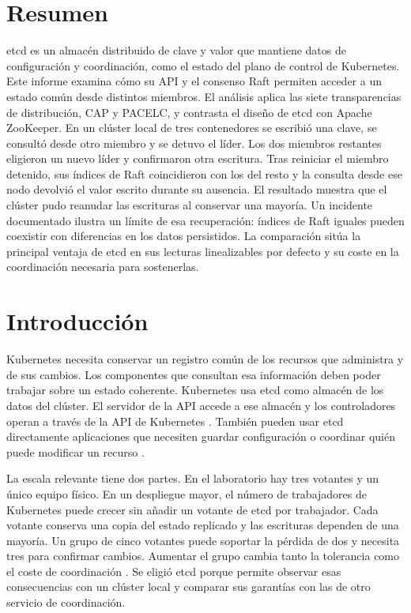 \documentclass[11pt,a4paper]{article}
\begin{document}
\section*{Resumen}
etcd es un almacén distribuido de clave y valor que mantiene datos de configuración y coordinación, como el estado del plano de control de Kubernetes. Este informe examina cómo su API y el consenso Raft permiten acceder a un estado común desde distintos miembros. El análisis aplica las siete transparencias de distribución, CAP y PACELC, y contrasta el diseño de etcd con Apache ZooKeeper. En un clúster local de tres contenedores se escribió una clave, se consultó desde otro miembro y se detuvo el líder. Los dos miembros restantes eligieron un nuevo líder y confirmaron otra escritura. Tras reiniciar el miembro detenido, sus índices de Raft coincidieron con los del resto y la consulta desde ese nodo devolvió el valor escrito durante su ausencia. El resultado muestra que el clúster pudo reanudar las escrituras al conservar una mayoría. Un incidente documentado ilustra un límite de esa recuperación: índices de Raft iguales pueden coexistir con diferencias en los datos persistidos. La comparación sitúa la principal ventaja de etcd en sus lecturas linealizables por defecto y su coste en la coordinación necesaria para sostenerlas.

\section{Introducción}
Kubernetes necesita conservar un registro común de los recursos que administra y de sus cambios. Los componentes que consultan esa información deben poder trabajar sobre un estado coherente. Kubernetes usa etcd como almacén de los datos del clúster. El servidor de la API accede a ese almacén y los controladores operan a través de la API de Kubernetes \cite{kubernetes}. También pueden usar etcd directamente aplicaciones que necesiten guardar configuración o coordinar quién puede modificar un recurso \cite{etcdapi}.

La escala relevante tiene dos partes. En el laboratorio hay tres votantes y un único equipo físico. En un despliegue mayor, el número de trabajadores de Kubernetes puede crecer sin añadir un votante de etcd por trabajador. Cada votante conserva una copia del estado replicado y las escrituras dependen de una mayoría. Un grupo de cinco votantes puede soportar la pérdida de dos y necesita tres para confirmar cambios. Aumentar el grupo cambia tanto la tolerancia como el coste de coordinación \cite{etcdfaq}. Se eligió etcd porque permite observar esas consecuencias con un clúster local y comparar sus garantías con las de otro servicio de coordinación.
\end{document}
